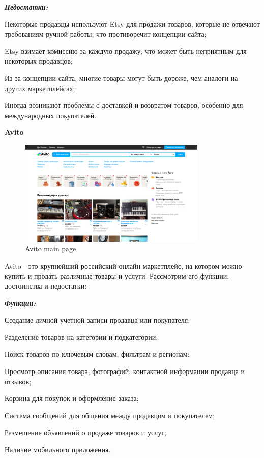 \textbf{\emph{Недостатки:}}

\begin{compactitem}
    \item  Некоторые продавцы используют Etsy для продажи товаров, которые не отвечают требованиям ручной работы, что противоречит концепции сайта;
    \item  Etsy взимает комиссию за каждую продажу, что может быть неприятным для некоторых продавцов;
    \item  Из-за концепции сайта, многие товары могут быть дороже, чем аналоги на других маркетплейсах;
    \item  Иногда возникают проблемы с доставкой и возвратом товаров, особенно для международных покупателей.
\end{compactitem}







\textbf{Avito}

\begin{figure}[h]
    \centering
    \includegraphics[width=0.8\textwidth]{./images/avito_main.png}
    \caption{Avito main page}
\end{figure}

Avito - это крупнейший российский онлайн-маркетплейс, на котором можно купить и продать различные товары и услуги. Рассмотрим его функции, достоинства и недостатки:

\textbf{\emph{Функции:}}

\begin{compactitem}
    \item  Создание личной учетной записи продавца или покупателя;
    \item  Разделение товаров на категории и подкатегории;
    \item  Поиск товаров по ключевым словам, фильтрам и регионам;
    \item  Просмотр описания товара, фотографий, контактной информации продавца и отзывов;
    \item  Корзина для покупок и оформление заказа;
    \item  Система сообщений для общения между продавцом и покупателем;
    \item  Размещение объявлений о продаже товаров и услуг;
    \item  Наличие мобильного приложения.
\end{compactitem}

